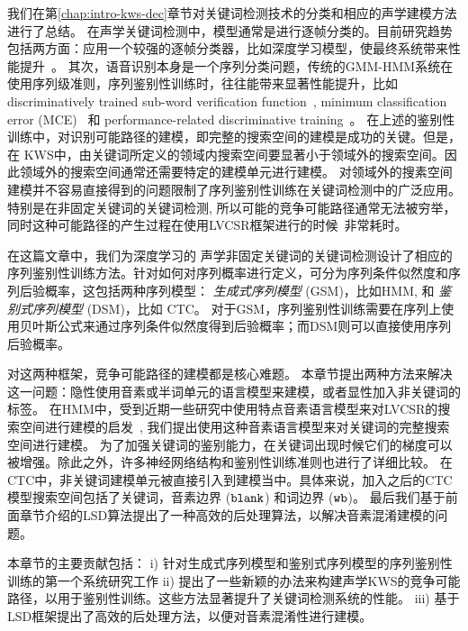 我们在第\ref{chap:intro-kws-dec}章节对关键词检测技术的分类和相应的声学建模方法进行了总结。
%
在声学关键词检测中，模型通常是进行逐帧分类的。目前研究趋势包括两方面：应用一个较强的逐帧分类器，比如深度学习模型，使最终系统带来性能提升~\cite{chen2014small,sainath2015convolutional}。 其次，语音识别本身是一个序列分类问题，传统的GMM-HMM系统在使用序列级准则，序列鉴别性训练时，往往能带来显著性能提升，比如discriminatively trained sub-word verification function~\cite{sukkar1996vocabulary}, minimum classification error (MCE)~\cite{sandness2000keyword} 和 performance-related discriminative training~\cite{keshet2009discriminative}。
在上述的鉴别性训练中，对识别可能路径的建模，即完整的搜索空间的建模是成功的关键。但是，在 KWS中，由关键词所定义的领域内搜索空间要显著小于领域外的搜索空间。因此领域外的搜索空间通常还需要特定的建模单元进行建模。
对领域外的搜素空间建模并不容易直接得到的问题限制了序列鉴别性训练在关键词检测中的广泛应用。
特别是在非固定关键词的关键词检测, 所以可能的竞争可能路径通常无法被穷举，同时这种可能路径的产生过程在使用LVCSR框架进行的时候~\cite{povey2005discriminative}非常耗时。 

在这篇文章中，我们为深度学习的 声学非固定关键词的关键词检测设计了相应的序列鉴别性训练方法。针对如何对序列概率进行定义，可分为序列条件似然度和序列后验概率，这包括两种序列模型： {\em 生成式序列模型} (GSM)，比如HMM, 和 {\em 鉴别式序列模型} (DSM)，比如 CTC。
对于GSM，序列鉴别性训练需要在序列上使用贝叶斯公式来通过序列条件似然度得到后验概率；而DSM则可以直接使用序列后验概率。

对这两种框架，竞争可能路径的建模都是核心难题。
本章节提出两种方法来解决这一问题：隐性使用音素或半词单元的语言模型来建模，或者显性加入非关键词的标签。
在HMM中，受到近期一些研究中使用特点音素语言模型来对LVCSR的搜索空间进行建模的启发~\cite{povey2016purely,chen2006advances},  我们提出使用这种音素语言模型来对关键词的完整搜索空间进行建模。
为了加强关键词的鉴别能力，在关键词出现时候它们的梯度可以被增强。除此之外，许多神经网络结构和鉴别性训练准则也进行了详细比较。
在CTC中，非关键词建模单元被直接引入到建模当中。具体来说，加入之后的CTC模型搜索空间包括了关键词，音素边界 ($\tt blank$) 和词边界 ($\tt wb$)。 
最后我们基于前面章节介绍的LSD算法提出了一种高效的后处理算法，以解决音素混淆建模的问题。

本章节的主要贡献包括：
i) 针对生成式序列模型和鉴别式序列模型的序列鉴别性训练的第一个系统研究工作
ii) 提出了一些新颖的办法来构建声学KWS的竞争可能路径，以用于鉴别性训练。这些方法显著提升了关键词检测系统的性能。
iii) 基于 LSD框架提出了高效的后处理方法，以便对音素混淆性进行建模。



